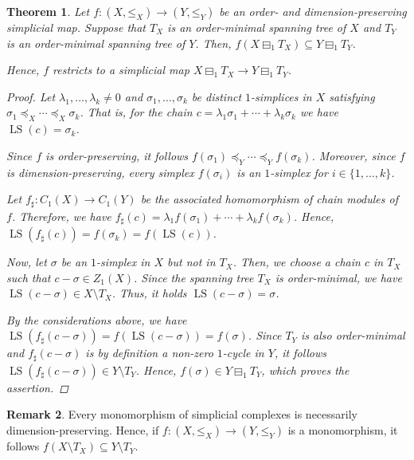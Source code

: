 \documentclass[oneside]{amsart}
\newtheorem{theorem}{Theorem}
\theoremstyle{definition}
\newtheorem{remark}[theorem]{Remark}
\DeclareMathOperator\LS{LS}
\begin{document}
\begin{theorem}%
    \label{theorem:ComplementInclusionFunctorial}
    Let $f\colon (X, \mathord\leq_X) \to (Y, \mathord\leq_Y)$ be an order- and dimension-preserving simplicial map.
    Suppose that $T_X$ is an order-minimal spanning tree of $X$ and $T_Y$ is an order-minimal spanning tree of $Y$.
    Then, $f(X \boxminus_1 T_X) \subseteq Y \boxminus_1 T_Y$.
    
    Hence, $f$ restricts to a simplicial map $X \boxminus_1 T_X \to Y \boxminus_1 T_Y$.

    \begin{proof}
        Let $\lambda_1, \dotsc, \lambda_k \neq 0$ and $\sigma_1, \dotsc, \sigma_k$ be distinct $1$-simplices in $X$ satisfying $\sigma_1 \preceq_X \dotsb \preceq_X \sigma_k$.
        That is, for the chain $c = \lambda_1 \sigma_1 + \dotsb + \lambda_k \sigma_k$ we have $\LS(c) = \sigma_k$.
    
        Since $f$ is order-preserving, it follows $f(\sigma_1) \preceq_Y \dotsb \preceq_Y f(\sigma_k)$.
        Moreover, since $f$ is dimension-preserving, every simplex $f(\sigma_i)$ is an $1$-simplex for $i \in \{ 1, \dotsc, k \}$.
        
        Let $f_\sharp\colon C_1(X) \to C_1(Y)$ be the associated homomorphism of chain modules of~$f$.
        Therefore, we have $f_\sharp(c) = \lambda_1 f(\sigma_1) + \dotsb + \lambda_k f(\sigma_k)$.
        Hence, $\LS(f_\sharp(c)) = f(\sigma_k) = f(\LS(c))$.
    
        Now, let $\sigma$ be an $1$-simplex in $X$ but not in $T_X$.
        Then, we choose a chain $c$ in $T_X$ such that $c - \sigma \in Z_1(X)$.
        Since the spanning tree $T_X$ is order-minimal, we have $\LS(c - \sigma) \in X \setminus T_X$.
        Thus, it holds $\LS(c - \sigma) = \sigma$.
    
        By the considerations above, we have $\LS(f_\sharp(c - \sigma)) = f(\LS(c - \sigma)) = f(\sigma)$.
        Since $T_Y$ is also order-minimal and $f_\sharp(c - \sigma)$ is by definition a non-zero $1$-cycle in $Y$, it follows $\LS(f_\sharp(c - \sigma)) \in Y \setminus T_Y$.
        Hence, $f(\sigma) \in Y \boxminus_1 T_Y$, which proves the assertion.
    \end{proof}    
\end{theorem}

\begin{remark}%
    \label{remark:MonoIsDimPreserv}
    Every monomorphism of simplicial complexes is necessarily dimension-preserving.
    Hence, if $f\colon (X, \mathord\leq_X) \to (Y, \mathord\leq_Y)$ is a monomorphism, it follows $f(X \setminus T_X) \subseteq Y \setminus T_Y$.
\end{remark}
\end{document}
